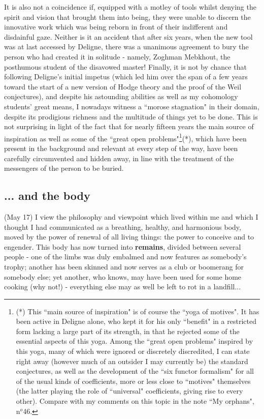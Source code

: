 It is also not a coincidence if, equipped with a motley of tools whilst denying the spirit and vision that brought them into being, they were unable to discern the innovative work which was being reborn in front of their indifferent and disdainful gaze. Neither is it an accident that after six years, when the new tool was at last accessed by Deligne, there was a unanimous agreement to bury the person who had created it in solitude - namely, Zoghman Mebkhout, the posthumous student of the disavowed master! Finally, it is not by chance that following Deligne's initial impetus (which led him over the span of a few years toward the start of a new version of Hodge theory and the proof of the Weil conjectures), and despite his astounding abilities as well as my cohomology students' great means, I nowadays witness a ``morose stagnation" in their domain, despite its prodigious richness and the multitude of things yet to be done. This is not surprising in light of the fact that for nearly fifteen years the main source of inspiration as well as some of the ``great open problems"\footnote{(*) This ``main source of inspiration" is of course the ``yoga of motives". It has been active in Deligne alone, who kept it for his only ``benefit" in a restricted form lacking a large part of its strength, in that he rejected some of the essential aspects of this yoga. Among the ``great open problems" inspired by this yoga, many of which were ignored or discretely discredited, I can state right away (however much of an outsider I may currently be) the standard conjectures, as well as the development of the ``six functor formalism" for all of the usual kinds of coefficients, more or less close to ``motives" themselves (the latter playing the role of ``universal" coefficients, giving rise to every other). Compare with my comments on this topic in the note ``My orphans", n$^o$46.}(*), which have been present in the background and relevant at every step of the way, have been carefully circumvented and hidden away, in line with the treatment of the messengers of the person to be buried.

\subsection{... and the body}

 (May 17) I view the philosophy and viewpoint which lived within me and which I thought I had communicated as a breathing, healthy, and harmonious body, moved by the power of renewal of all living things: the power to conceive and to engender. This body has now turned into \textbf{remains}, divided between several people - one of the limbs was duly embalmed and now features as somebody's trophy; another has been skinned and now serves as a club or boomerang for somebody else; yet another, who knows, may have been used for some home cooking (why not!) - everything else may as well be left to rot in a landfill...

